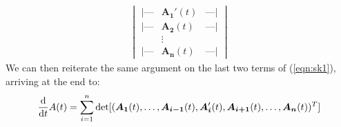 \documentclass[../template.tex]{subfiles}
\begin{document}
\begin{expl}
\begin{align*}
\begin{vmatrix}
            \text{|---} & \bm{A_1}'(t) & \text{---|} \\
            \text{|---} & \bm{A_2}(t) & \text{---|} \\
            & \vdots & \\
            \text{|---} & \bm{A_n}(t) & \text{---|} 
        \end{vmatrix}
    \end{align*}
    We can then reiterate the same argument on the last two terms of (\ref{eqn:sk1}), arriving at the end to:
    \begin{align*}
        \dv{t} A(t) = \sum_{i=1}^n \operatorname{det}[(\bm{A_1}(t), \dots, \bm{A_{i-1}}(t), \bm{A_i}'(t), \bm{A_{i+1}}(t), \dots, \bm{A_n}(t) )^T]
    \end{align*}
\end{expl}
\end{document}
